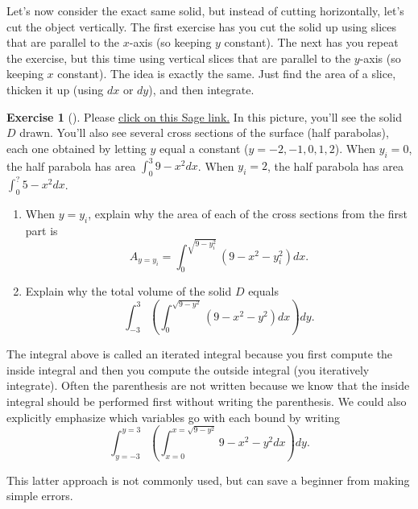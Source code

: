 \documentclass[10pt,]{book}
\theoremstyle{plain}
\theoremstyle{definition}
\theoremstyle{definition}
\theoremstyle{definition}
\theoremstyle{definition}
\newtheorem{exploration}[project]{Exercise}
\theoremstyle{definition}
\numberwithin{equation}{section}
\newcommand{\ds}{\displaystyle}
\begin{document}
Let's now consider the exact same solid, but instead of cutting horizontally, let's cut the object vertically. The first exercise has you cut the solid up using slices that are parallel to the \(x\)-axis (so keeping \(y\) constant). The next has you repeat the exercise, but this time using vertical slices that are parallel to the \(y\)-axis (so keeping \(x\) constant). The idea is exactly the same. Just find the area of a slice, thicken it up (using \(dx\) or \(dy\)), and then integrate.%
\begin{exploration}[]\label{prob_double-int_half_parabolic}
Please \href{http://bmw.byuimath.com/dokuwiki/doku.php?id=cross_sections_of_solid_by_letting_y_equal_a_constant}{click on this Sage link.} In this picture, you'll see the solid \(D\) drawn. You'll also see several cross sections of the surface (half parabolas), each one obtained by letting \(y\) equal a constant (\(y=-2, -1,0,1,2\)). When \(y_i=0\), the half parabola has area \(\int_0^3 9-x^2dx\). When \(y_i=2\), the half parabola has area \(\int_0^? 5-x^2dx\).%
\begin{enumerate}[font=\bfseries,label=(\alph*),ref=\alph*]
\item\label{task-674} When \(y=y_i\), explain why the area of each of the cross sections from the first part is%
\begin{equation*}
A_{y=y_i}=\ds \int_0^{\sqrt{9-y_i^2}} (9-x^2-y_i^2) dx.
\end{equation*}
%
\item\label{task-675} Explain why the total volume of the solid \(D\) equals%
\begin{equation*}
\ds\int_{-3}^{3} \left(\int_0^{\sqrt{9-y^2}}(9-x^2-y^2) dx\right) dy.
\end{equation*}
%
\end{enumerate}
\end{exploration}
The integral above is called an iterated integral because you first compute the inside integral and then you compute the outside integral (you iteratively integrate). Often the parenthesis are not written because we know that the inside integral should be performed first without writing the parenthesis. We could also explicitly emphasize which variables go with each bound by writing%
\begin{equation*}
\ds\int_{y=-3}^{y=3} \left(\int_{x=0}^{x=\sqrt{9-y^2}}9-x^2-y^2 dx\right) dy.
\end{equation*}
%
\par
This latter approach is not commonly used, but can save a beginner from making simple errors.%
\end{document}
